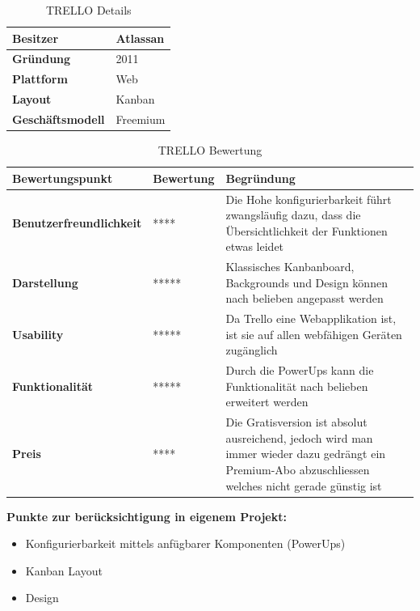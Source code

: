 \begin{table}[H]
    \centering
    \settowidth{}
    \setlength\extrarowheight{2pt}
    \begin{tabulary}{1.0\textwidth}{|L|L|}
      \hline
      \textbf{Besitzer} &
      Atlassan\\
      \hline
      \textbf{Gründung} &
      2011\\
      \hline
      \textbf{Plattform} &
      Web\\
      \hline
      \textbf{Layout} &
      Kanban\\
      \hline
      \textbf{Geschäftsmodell} &
      Freemium\\
      \hline
    \end{tabulary}
    \caption{TRELLO Details}
  \end{table}

\begin{table}[H]
    \centering
    \settowidth{}
    \setlength\extrarowheight{2pt}
    \begin{tabulary}{1.0\textwidth}{|L|L|L|}
      \hline
      \textbf{Bewertungspunkt} &
      \textbf{Bewertung} &
      \textbf{Begründung} \\
      \hline
      \textbf{Benutzerfreundlichkeit} &
      ****&
      Die Hohe konfigurierbarkeit führt zwangsläufig dazu, dass die Übersichtlichkeit der Funktionen etwas leidet\\
      \hline
      \textbf{Darstellung} &
      *****&
      Klassisches Kanbanboard, Backgrounds und Design können nach belieben angepasst werden\\
      \hline
      \textbf{Usability} &
      *****&
      Da Trello eine Webapplikation ist, ist sie auf allen webfähigen Geräten zugänglich\\
      \hline
      \textbf{Funktionalität} &
      *****&
      Durch die PowerUps kann die Funktionalität nach belieben erweitert werden\\
      \hline
      \textbf{Preis} &
      ****&
      Die Gratisversion ist absolut ausreichend, jedoch wird man immer wieder dazu gedrängt ein Premium-Abo abzuschliessen welches nicht gerade günstig ist\\
      \hline
    \end{tabulary}
    \caption{TRELLO Bewertung}
  \end{table}
\space
\textbf{Punkte zur berücksichtigung in eigenem Projekt:}
\begin{itemize}
    \item Konfigurierbarkeit mittels anfügbarer Komponenten (PowerUps)
    \item Kanban Layout
    \item Design
\end{itemize}

  
  